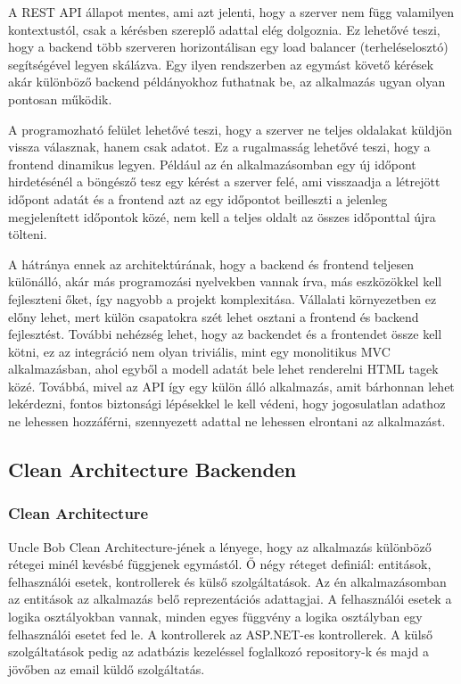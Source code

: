A REST API állapot mentes, ami azt jelenti, hogy a szerver nem függ valamilyen kontextustól, csak a kérésben szereplő adattal elég dolgoznia. Ez lehetővé teszi, hogy a backend több szerveren horizontálisan egy load balancer (terheléselosztó) segítségével legyen skálázva. Egy ilyen rendszerben az egymást követő kérések akár különböző backend példányokhoz futhatnak be, az alkalmazás ugyan olyan pontosan működik.

A programozható felület lehetővé teszi, hogy a szerver ne teljes oldalakat küldjön vissza válasznak, hanem csak adatot. Ez a rugalmasság lehetővé teszi, hogy a frontend dinamikus legyen. Például az én alkalmazásomban egy új időpont hirdetésénél a böngésző tesz egy kérést a szerver felé, ami visszaadja a létrejött időpont adatát és a frontend azt az egy időpontot beilleszti a jelenleg megjelenített időpontok közé, nem kell a teljes oldalt az összes időponttal újra tölteni.

A hátránya ennek az architektúrának, hogy a backend és frontend teljesen különálló, akár más programozási nyelvekben vannak írva, más eszközökkel kell fejleszteni őket, így nagyobb a projekt komplexitása. Vállalati környezetben ez előny lehet, mert külön csapatokra szét lehet osztani a frontend és backend fejlesztést. További nehézség lehet, hogy az backendet és a frontendet össze kell kötni, ez az integráció nem olyan triviális, mint egy monolitikus MVC alkalmazásban, ahol egyből a modell adatát bele lehet renderelni HTML tagek közé. Továbbá, mivel az API így egy külön álló alkalmazás, amit bárhonnan lehet lekérdezni, fontos biztonsági lépésekkel le kell védeni, hogy jogosulatlan adathoz ne lehessen hozzáférni, szennyezett adattal ne lehessen elrontani az alkalmazást.

\subsection{Clean Architecture Backenden}
\subsubsection{Clean Architecture}
Uncle Bob Clean Architecture\cite{cleanArchitecturePost}-jének a lényege, hogy az alkalmazás különböző rétegei minél kevésbé függjenek egymástól. Ő négy réteget definiál: entitások, felhasználói esetek, kontrollerek és külső szolgáltatások. Az én alkalmazásomban az entitások az alkalmazás belő reprezentációs adattagjai. A felhasználói esetek a logika osztályokban vannak, minden egyes függvény a logika osztályban egy felhasználói esetet fed le. A kontrollerek az ASP.NET-es kontrollerek. A külső szolgáltatások pedig az adatbázis kezeléssel foglalkozó repository-k és majd a jövőben az email küldő szolgáltatás.

